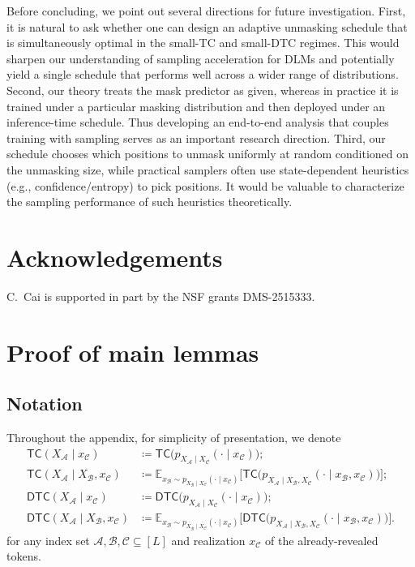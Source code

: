 \documentclass[english]{article}
\newcommand{\defn}{\coloneqq}
\newcommand{\cA}{\mathcal{A}}
\newcommand{\cB}{\mathcal{B}}
\newcommand{\cC}{\mathcal{C}}
\newcommand{\bE}{\mathbb{E}}
\newcommand{\TC}{\mathsf{TC}}
\newcommand{\DTC}{\mathsf{DTC}}
\begin{document}
Before concluding, we point out several directions for future investigation.
First, it is natural to ask whether one can design an adaptive unmasking schedule that is simultaneously optimal in the small-TC and small-DTC regimes. This would sharpen our understanding of sampling acceleration for DLMs and potentially yield a single schedule that performs well across a wider range of distributions.
Second, our theory treats the mask predictor as given, whereas in practice it is trained under a particular masking distribution and then deployed under an inference-time schedule.
Thus developing an end-to-end analysis that couples training with sampling serves as an important research direction.
Third, our schedule chooses which positions to unmask uniformly at random conditioned on the unmasking size, while practical samplers often use state-dependent heuristics (e.g., confidence/entropy) to pick positions.
It would be valuable to characterize the sampling performance of such heuristics theoretically.


\section*{Acknowledgements}

C.\ Cai is supported in part by the NSF grants DMS-2515333.




\appendix
\section{Proof of main lemmas}

\subsection{Notation}

Throughout the appendix, for simplicity of presentation, we denote 
\begin{align*}
\TC(X_{\cA} \mid x_{\cC}) &\defn \TC \big(p_{X_{\cA} \mid X_{\cC}}(\cdot \mid x_{\cC})\big); \\
\TC( X_{\cA }\mid X_{\cB } , x_{\cC}) &\defn \bE_{x_{\cB} \sim p_{X_{\cB} \mid X_{\cC}}(\cdot \mid x_{\cC})} \Big[ \TC\big(p_{X_{\cA} \mid X_{\cB}, X_{\cC}}(\cdot \mid x_{\cB}, x_{\cC}) \big)\Big]; \\
\DTC(X_{\cA} \mid x_{\cC}) &\defn \DTC \big(p_{X_{\cA} \mid X_{\cC}}(\cdot \mid x_{\cC})\big); \\
\DTC( X_{\cA }\mid X_{\cB } , x_{\cC}) &\defn \bE_{x_{\cB} \sim p_{X_{\cB} \mid X_{\cC}}(\cdot \mid x_{\cC})} \Big[ \DTC\big(p_{X_{\cA} \mid X_{\cB}, X_{\cC}}(\cdot \mid x_{\cB}, x_{\cC}) \big)\Big].
\end{align*}
for any index set $\cA,\cB,\cC\subseteq [L]$ and realization $x_{\cC}$ of the already-revealed tokens.
\end{document}
